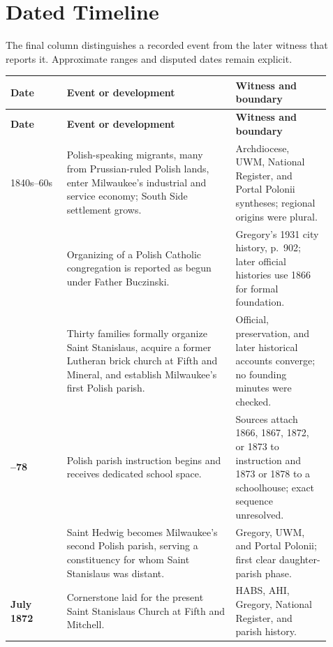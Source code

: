 \section{Dated Timeline}

The final column distinguishes a recorded event from the later witness that reports it. Approximate ranges and disputed dates remain explicit.

\begin{longtable}{>{\bfseries\RaggedRight\arraybackslash}p{0.16\linewidth}>{\RaggedRight\arraybackslash}p{0.48\linewidth}>{\RaggedRight\arraybackslash}p{0.27\linewidth}}
\toprule
\textbf{Date} & \textbf{Event or development} & \textbf{Witness and boundary}\\
\midrule
\endfirsthead
\toprule
\textbf{Date} & \textbf{Event or development} & \textbf{Witness and boundary}\\
\midrule
\endhead
\bottomrule
\endfoot

1840s--60s & Polish-speaking migrants, many from Prussian-ruled Polish lands, enter Milwaukee's industrial and service economy; South Side settlement grows. & Archdiocese, UWM, National Register, and Portal Polonii syntheses; regional origins were plural.\\

1863 & Organizing of a Polish Catholic congregation is reported as begun under Father Buczinski. & Gregory's 1931 city history, p.~902; later official histories use 1866 for formal foundation.\\

1866 & Thirty families formally organize Saint Stanislaus, acquire a former Lutheran brick church at Fifth and Mineral, and establish Milwaukee's first Polish parish. & Official, preservation, and later historical accounts converge; no founding minutes were checked.\\

1866--78 & Polish parish instruction begins and receives dedicated school space. & Sources attach 1866, 1867, 1872, or 1873 to instruction and 1873 or 1878 to a schoolhouse; exact sequence unresolved.\\

1871 & Saint Hedwig becomes Milwaukee's second Polish parish, serving a constituency for whom Saint Stanislaus was distant. & Gregory, UWM, and Portal Polonii; first clear daughter-parish phase.\\

July 1872 & Cornerstone laid for the present Saint Stanislaus Church at Fifth and Mitchell. & HABS, AHI, Gregory, National Register, and parish history.\\


\end{longtable}
